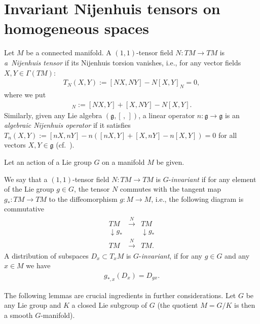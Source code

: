 \section{Invariant Nijenhuis tensors on homogeneous spaces}\label{s.1}

\begin{Definition}\label{nijdef}Let $M$ be a connected manifold. A $(1,1)$-tensor field $N\colon TM\to TM$ is \emph{a~Nijenhuis tensor} if its Nijenhuis torsion vanishes,
i.e., for any vector fields $X,Y\in \Gamma(TM)$:
\begin{gather*}
 T_N(X,Y):=[NX,NY]-N [X,Y]_N=0,
\end{gather*}
where we put
\begin{gather*}
[X,Y]_N:=[NX,Y]+[X,NY]-N[X,Y].
\end{gather*}
Similarly, given any Lie algebra $(\mathfrak{g}, [\,,\,])$, a linear operator $n\colon \mathfrak{g}\to\mathfrak{g}$ is an \emph{algebraic Nijenhuis operator} if it satisfies
$T_n(X,Y):=[nX,nY]-n ( [nX,Y] + [X,nY] - n[X,Y] )=0$ for all vectors $X,Y\in \mathfrak{g}$ (cf.~\cite{golsok2000,mks}).
\end{Definition}

Let an action of a Lie group $G$ on a manifold $M$ be given.

\begin{Definition}\label{def2}We say that a $(1,1)$-tensor field $N\colon TM\to TM$ is $G$-\emph{invariant} if for any element of the Lie group $ g\in G$, the tensor $N$ commutes with the tangent map $g_*\colon TM \to TM$ to the diffeomorphism $g\colon M\to M$, i.e., the following diagram is commutative
\begin{gather*}
\begin{matrix}
TM & \stackrel{N}{\longrightarrow}& TM \\
\downarrow g_*& & \downarrow g_* \\
TM &\stackrel{N}{\longrightarrow}&TM .
\end{matrix}
\end{gather*}
A distribution of subspaces $D_x \subset T_xM$ is $G$-\emph{invariant}, if for any $g\in G$ and any $x\in M$ we have
\begin{gather*}
g_{*,x}(D_x)=D_{gx}.
\end{gather*}
\end{Definition}

The following lemmas are crucial ingredients in further considerations. Let $G$ be any Lie group and $K$ a closed Lie subgroup of $G$ (the quotient $M=G/K$ is then a smooth $G$-manifold).

